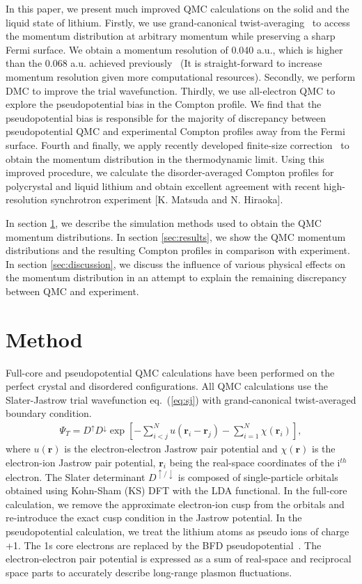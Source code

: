 \documentclass[aps,prb,showpacs,preprintnumbers,amsmath,amssymb,superscriptaddress,twocolumn]{revtex4}
\newcommand{\bs}{\boldsymbol}
\newcommand{\up}{\uparrow}
\newcommand{\down}{\downarrow}
\begin{document}
In this paper, we present much improved QMC calculations on the solid and the liquid state of lithium. Firstly, we use grand-canonical twist-averaging~\cite{Lin2001} to access the momentum distribution at arbitrary momentum while preserving a sharp Fermi surface. We obtain a momentum resolution of 0.040 a.u., which is higher than the 0.068 a.u. achieved previously~\cite{Filippi1999} (It is straight-forward to increase momentum resolution given more computational resources). Secondly, we perform DMC to improve the trial wavefunction. Thirdly, we use all-electron QMC to explore the pseudopotential bias in the Compton profile. We find that the pseudopotential bias is responsible for the majority of discrepancy between pseudopotential QMC and experimental Compton profiles away from the Fermi surface. Fourth and finally, we apply recently developed finite-size correction~\cite{Holzmann2009,Holzmann2011} to obtain the momentum distribution in the thermodynamic limit. Using this improved procedure, we calculate the disorder-averaged Compton profiles for polycrystal and liquid lithium and obtain excellent agreement with recent high-resolution synchrotron experiment [K. Matsuda and N. Hiraoka].

In section \ref{sec:method}, we describe the simulation methods used to obtain the QMC momentum distributions. In section \ref{sec:results}, we show the QMC momentum distributions and the resulting Compton profiles in comparison with experiment. In section \ref{sec:discussion}, we discuss the influence of various physical effects on the momentum distribution in an attempt to explain the remaining discrepancy between QMC and experiment.

\section{Method} \label{sec:method}

Full-core and pseudopotential QMC calculations have been performed on the perfect crystal and disordered configurations. All QMC calculations use the Slater-Jastrow trial wavefunction eq.~(\ref{eq:sj}) with grand-canonical twist-averaged boundary condition.
\begin{align}
\Psi_T = D^{\up} D^{\down} \exp\left[ -\sum\limits_{i<j}^{N} u(\bs{r}_i-\bs{r}_j) - \sum\limits_{i=1}^N \chi(\bs{r}_i) \right],\label{eq:sj}
\end{align}
where $u(\bs{r})$ is the electron-electron Jastrow pair potential and $\chi(\bs{r})$ is the electron-ion Jastrow pair potential, $\bs{r}_i$ being the real-space coordinates of the i$^{th}$ electron. The Slater determinant $D^{\up/\down}$ is composed of single-particle orbitals obtained using Kohn-Sham (KS) DFT with the LDA functional. In the full-core calculation, we remove the approximate electron-ion cusp from the orbitals and re-introduce the exact cusp condition in the Jastrow potential. In the pseudopotential calculation, we treat the lithium atoms as pseudo ions of charge +1. The 1s core electrons are replaced by the BFD pseudopotential~\cite{Burkatzki2007}.  The electron-electron pair potential is expressed as a sum of real-space and reciprocal space parts to accurately describe long-range plasmon fluctuations.
\end{document}
